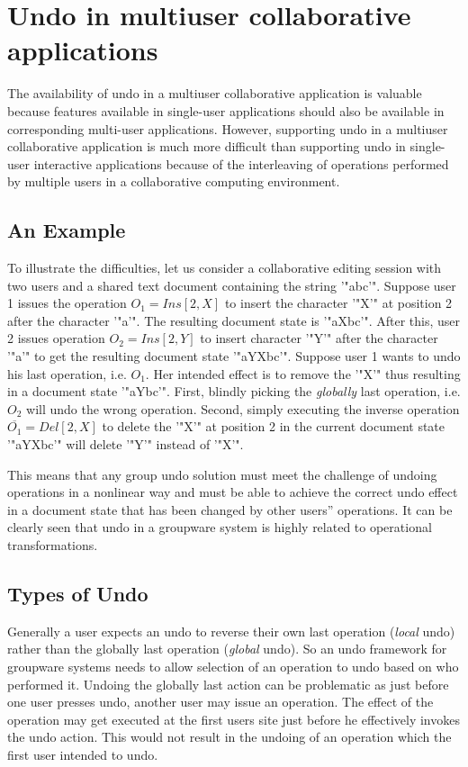 \appendix

\section{Undo in multiuser collaborative applications}

The availability of undo in a multiuser collaborative application is valuable because features available in single-user applications should also be available in corresponding multi-user applications. However, supporting undo in a multiuser collaborative application is much more difficult than supporting undo in single-user interactive applications because of the interleaving of operations performed by multiple users in a collaborative computing environment.


\subsection{An Example}

To illustrate the difficulties, let us consider a collaborative editing session with two users and a shared text document containing the string '"abc'". Suppose user 1 issues the operation $O_{1} = Ins[2,X]$ to insert the character '"X'" at position 2 after the character '"a'". The resulting document state is '"aXbc'". After this, user 2 issues operation $O_{2} = Ins[2,Y]$ to insert character '"Y'" after the character '"a'" to get the resulting document state '"aYXbc'". Suppose user 1 wants to undo his last operation, i.e. $O_{1}$. Her intended effect is to remove the '"X'" thus resulting in a document state '"aYbc'". First, blindly picking the \emph{globally} last operation, i.e. $O_{2}$ will undo the wrong operation. Second, simply executing the inverse operation $\overline{O_{1}} = Del[2,X]$ to delete the '"X'" at position 2 in the current document state '"aYXbc'" will delete '"Y'" instead of '"X'".

This means that any group undo solution must meet the challenge of undoing operations in a nonlinear way and must be able to achieve the correct undo effect in a document state that has been changed by other users'' operations. It can be clearly seen that undo in a groupware system is highly related to operational transformations.


\subsection{Types of Undo}

Generally a user expects an undo to reverse their own last operation (\emph{local} undo) rather than the globally last operation (\emph{global} undo). So an undo framework for groupware systems needs to allow selection of an operation to undo based on who performed it. Undoing the globally last action can be problematic as just before one user presses undo, another user may issue an operation. The effect of the operation may get executed at the first users site just before he effectively invokes the undo action. This would not result in the undoing of an operation which the first user intended to undo.

